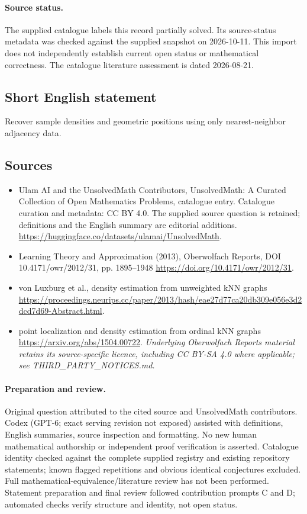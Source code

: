 \documentclass[11pt]{article}
\begin{document}
\paragraph{Source status.}
The supplied catalogue labels this record partially solved. Its source-status metadata was checked against the supplied snapshot on 2026-10-11. This import does not independently establish current open status or mathematical correctness. The catalogue literature assessment is dated 2026-08-21.
\subsection{Short English statement}
Recover sample densities and geometric positions using only nearest-neighbor adjacency data.
\subsection{Sources}
\begin{itemize}
\item[S1] Ulam AI and the UnsolvedMath Contributors, UnsolvedMath: A Curated Collection of Open Mathematics Problems, catalogue entry. Catalogue curation and metadata: CC BY 4.0. The supplied source question is retained; definitions and the English summary are editorial additions.
\url{https://huggingface.co/datasets/ulamai/UnsolvedMath}.
\item[S2] Learning Theory and Approximation (2013), Oberwolfach Reports, DOI 10.4171/owr/2012/31, pp. 1895--1948
\url{https://doi.org/10.4171/owr/2012/31}.
\item[S3] von Luxburg et al., density estimation from unweighted kNN graphs
\url{https://proceedings.neurips.cc/paper/2013/hash/eae27d77ca20db309e056e3d2dcd7d69-Abstract.html}.
\item[S4] point localization and density estimation from ordinal kNN graphs
\url{https://arxiv.org/abs/1504.00722}.
\textit{Underlying Oberwolfach Reports material retains its source-specific licence, including CC BY-SA 4.0 where applicable; see THIRD\_PARTY\_NOTICES.md.}
\end{itemize}
\paragraph{Preparation and review.}
Original question attributed to the cited source and UnsolvedMath contributors. Codex (GPT-6; exact serving revision not exposed) assisted with definitions, English summaries, source inspection and formatting. No new human mathematical authorship or independent proof verification is asserted. Catalogue identity checked against the complete supplied registry and existing repository statements; known flagged repetitions and obvious identical conjectures excluded. Full mathematical-equivalence/literature review has not been performed. Statement preparation and final review followed contribution prompts C and D; automated checks verify structure and identity, not open status.
\label{end:statement}
\end{document}

